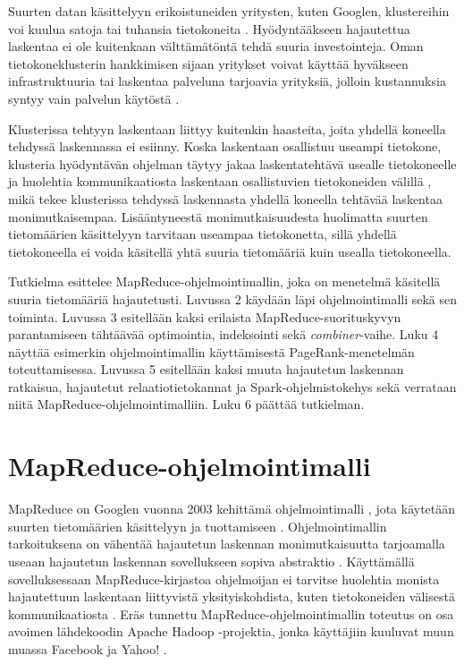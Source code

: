 \documentclass[finnish]{templates/tktltiki2}
\theoremstyle{definition}
\theoremstyle{remark}
\begin{document}
Suurten datan käsittelyyn erikoistuneiden yritysten, kuten Googlen,
klustereihin voi kuulua satoja tai tuhansia tietokoneita
\cite{mapreduce}. Hyödyntääkseen hajautettua laskentaa ei ole
kuitenkaan välttämätöntä tehdä suuria investointeja. Oman
tietokoneklusterin hankkimisen sijaan yritykset voivat käyttää hyväkseen
infrastruktuuria tai laskentaa palveluna tarjoavia yrityksiä, jolloin
kustannuksia syntyy vain palvelun käytöstä \cite{cloudcomputing}.

Klusterissa tehtyyn laskentaan liittyy kuitenkin haasteita, joita
yhdellä koneella tehdyssä laskennassa ei esiinny. Koska laskentaan
osallistuu useampi tietokone, klusteria hyödyntävän ohjelman täytyy
jakaa laskentatehtävä usealle tietokoneelle ja huolehtia
kommunikaatiosta laskentaan osallistuvien tietokoneiden välillä
\cite{cluster-grid-cloud}, mikä tekee klusterissa tehdyssä
laskennasta yhdellä koneella tehtävää laskentaa monimutkaisempaa.
Lisääntyneestä monimutkaisuudesta huolimatta suurten tietomäärien
käsittelyyn tarvitaan useampaa tietokonetta, sillä yhdellä tietokoneella
ei voida käsitellä yhtä suuria tietomääriä kuin usealla tietokoneella.

Tutkielma esittelee MapReduce-ohjelmointimallin, joka on menetelmä
käsitellä suuria tietomääriä hajautetusti. Luvussa 2 käydään läpi
ohjelmointimalli sekä sen toiminta. Luvussa 3 esitellään kaksi erilaista
MapReduce-suorituskyvyn parantamiseen tähtäävää optimointia, indeksointi
sekä \emph{combiner}-vaihe. Luku 4 näyttää esimerkin ohjelmointimallin
käyttämisestä PageRank-menetelmän toteuttamisessa. Luvussa 5 esitellään
kaksi muuta hajautetun laskennan ratkaisua, hajautetut
relaatiotietokannat ja Spark-ohjelmistokehys sekä verrataan niitä
MapReduce-ohjelmointimalliin. Luku 6 päättää tutkielman.

\section{MapReduce-ohjelmointimalli}\label{mapreduce-ohjelmointimalli}

MapReduce on Googlen vuonna 2003 kehittämä ohjelmointimalli \cite[
s. 72]{mapreduce2}, jota käytetään suurten tietomäärien käsittelyyn ja
tuottamiseen \cite{mapreduce}. Ohjelmointimallin
tarkoituksena on vähentää hajautetun laskennan monimutkaisuutta
tarjoamalla useaan hajautetun laskennan sovellukseen sopiva abstraktio
\cite{mapreduce}. Käyttämällä sovelluksessaan
MapReduce-kirjastoa ohjelmoijan ei tarvitse huolehtia monista
hajautettuun laskentaan liittyvistä yksityiskohdista, kuten
tietokoneiden välisestä kommunikaatiosta \cite{mapreduce}.
Eräs tunnettu MapReduce-ohjelmointimallin toteutus on osa avoimen
lähdekoodin Apache Hadoop -projektia, jonka käyttäjiin kuuluvat muun
muassa Facebook ja Yahoo! \cite{hive}.
\end{document}
